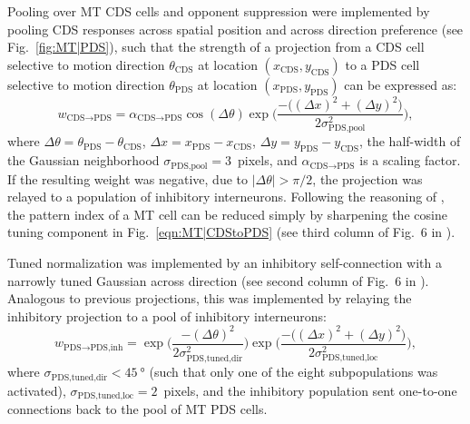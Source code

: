 Pooling over MT \ac{CDS} cells and opponent suppression
were implemented by pooling \ac{CDS} responses across spatial
position and across direction preference
(see Fig.~\ref{fig:MT|PDS}), such that the strength
of a projection from a \ac{CDS} cell selective to motion direction
$\theta_{\textrm{CDS}}$ at location
$(x_{\textrm{CDS}}, y_{\textrm{CDS}})$
to a \ac{PDS} cell selective to motion
direction $\theta_{\textrm{PDS}}$ at location
$(x_{\textrm{PDS}}, y_{\textrm{PDS}})$
can be expressed as:
\begin{equation}
w_{\textrm{CDS} \rightarrow \textrm{PDS}} = 
	\alpha_{\textrm{CDS} \rightarrow \textrm{PDS}}
    \cos(\Delta\theta)
    \exp \Bigg(
    \frac{
    	-\Big((\Delta x)^2 + (\Delta y)^2\Big)
    }{
    	2 \sigma_{\textrm{PDS,pool}}^2
    } \Bigg),
\label{eqn:MT|CDStoPDS}
\end{equation}
where
$\Delta \theta = \theta_{\textrm{PDS}} - \theta_{\textrm{CDS}}$,
$\Delta x = x_{\textrm{PDS}} - x_{\textrm{CDS}}$,
$\Delta y = y_{\textrm{PDS}} - y_{\textrm{CDS}}$,
the half-width of the Gaussian neighborhood
$\sigma_{\textrm{PDS,pool}} = 3$~pixels, 
and $\alpha_{\textrm{CDS} \rightarrow \textrm{PDS}}$
is a scaling factor. If the resulting
weight was negative, due to
$|\Delta \theta| > \pi/2$, the projection was
relayed to a population of inhibitory interneurons. Following
the reasoning of \cite{Rust2006}, the pattern index of a MT
cell can be reduced simply by sharpening the cosine tuning
component in Fig.~\ref{eqn:MT|CDStoPDS}
(see third column of Fig.~$6$ in \cite{Rust2006}).

Tuned normalization was implemented by an inhibitory
self-connection with a narrowly tuned Gaussian across direction
(see second column of Fig.~$6$ in \cite{Rust2006}).
Analogous to previous projections, this was implemented by
relaying the inhibitory projection to a pool of inhibitory interneurons:
\begin{equation}
w_{\textrm{PDS} \rightarrow \textrm{PDS,inh}} = 
    \exp \Bigg(
    \frac{
    	-(\Delta \theta)^2
    }{
    	2 \sigma_{\textrm{PDS,tuned,dir}}^2
    } \Bigg)
    \exp \Bigg(
    \frac{
    	-\Big((\Delta x)^2 + (\Delta y)^2\Big)
    }{
    	2 \sigma_{\textrm{PDS,tuned,loc}}^2
    } \Bigg),
\label{eqn:MT|PDStoPDSinh}
\end{equation}
where
$\sigma_{\textrm{PDS,tuned,dir}} < \SI{45}{\degree}$
(such that only one of the eight subpopulations was activated),
$\sigma_{\textrm{PDS,tuned,loc}} = 2$~pixels, and
the inhibitory population sent one-to-one connections back
to the pool of MT \ac{PDS} cells.


